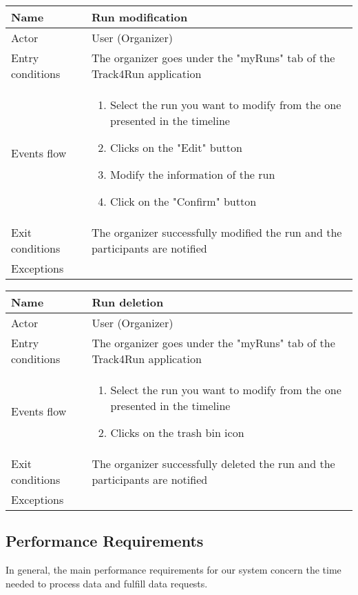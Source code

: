 \begin{table}[h!]
\begin{tabular}{|l|p{12cm}|}
\hline
Name             & Run modification \\ \hline
Actor            & User (Organizer) \\ \hline
Entry conditions & The organizer goes under the "myRuns" tab of the Track4Run application \\ \hline
Events flow      & \begin{enumerate}
\item Select the run you want to modify from the one presented in the timeline
\item Clicks on the "Edit" button
\item Modify the information of the run
\item Click on the "Confirm" button
\end{enumerate} \\ \hline
Exit conditions  & The organizer successfully modified the run and the participants are notified\\ \hline
Exceptions       &\\ \hline
\end{tabular}
\end{table}

\begin{table}[h!]
\begin{tabular}{|l|p{12cm}|}
\hline
Name             & Run deletion \\ \hline
Actor            & User (Organizer) \\ \hline
Entry conditions & The organizer goes under the "myRuns" tab of the Track4Run application \\ \hline
Events flow      & \begin{enumerate}
\item Select the run you want to modify from the one presented in the timeline
\item Clicks on the trash bin icon
\end{enumerate} \\ \hline
Exit conditions  & The organizer successfully deleted the run and the participants are notified\\ \hline
Exceptions       &\\ \hline
\end{tabular}
\end{table}

\newpage
\newpage
\subsection{Performance Requirements}
In general, the main performance requirements for our system concern the time needed to process data and fulfill data requests.

